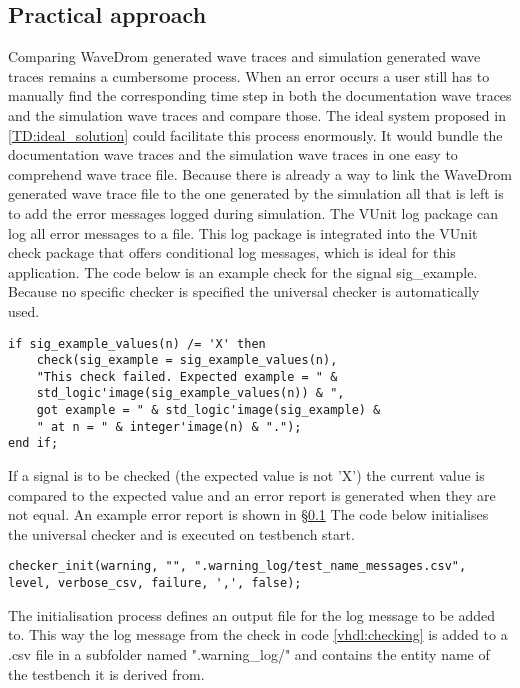 \subsection{Practical approach}\label{TD:practical_approach}\label{log:error_message}
Comparing WaveDrom generated wave traces and simulation generated wave traces remains a cumbersome process. When an error occurs a user still has to manually find the corresponding time step in both the documentation wave traces and the simulation wave traces and compare those.
\npar
The ideal system proposed in \ref{TD:ideal_solution} could facilitate this process enormously. It would bundle the documentation wave traces and the simulation wave traces in one easy to comprehend wave trace file.
\npar
Because there is already a way to link the WaveDrom generated wave trace file to the one generated by the simulation all that is left is to add the error messages logged during simulation. The VUnit log package can log all error messages to a file. This log package is integrated into the VUnit check package that offers conditional log messages, which is ideal for this application. The code below is an example check for the signal sig\_example. Because no specific checker is specified the universal checker is automatically used.
\begin{lstlisting}[style=vhdl, caption={Signal checking in VHDL}, label={vhdl:checking}]
if sig_example_values(n) /= 'X' then
	check(sig_example = sig_example_values(n),  
	"This check failed. Expected example = " &
	std_logic'image(sig_example_values(n)) & ", 
	got example = " & std_logic'image(sig_example) & 
	" at n = " & integer'image(n) & ".");
end if;
\end{lstlisting}\noindent
If a signal is to be checked (the expected value is not 'X') the current value is compared to the expected value and an error report is generated when they are not equal. An example error report is shown in §\ref{TD:practical_approach} The code below initialises the universal checker and is executed on testbench start.
\begin{lstlisting}[style=vhdl, caption={}, label={vhdl:checker_init}]
checker_init(warning, "", ".warning_log/test_name_messages.csv", level, verbose_csv, failure, ',', false);
\end{lstlisting}\noindent
The initialisation process defines an output file for the log message to be added to. This way the log message from the check in code \ref{vhdl:checking} is added to a .csv file in a subfolder named ".warning\_log/" and contains the entity name of the testbench it is derived from.
